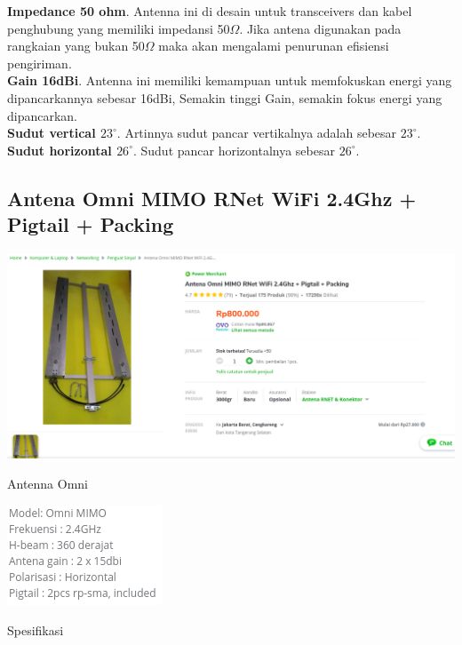 \documentclass[a4paper,12pt]{article}
\begin{document}
\textbf{Impedance 50 ohm}. Antenna ini di desain untuk transceivers dan kabel penghubung yang memiliki impedansi 50$\Omega$. Jika antena digunakan pada rangkaian
yang bukan 50$\Omega$ maka akan mengalami penurunan efisiensi pengiriman.\\

\textbf{Gain 16dBi}. Antenna ini memiliki kemampuan untuk memfokuskan energi yang dipancarkannya sebesar 16dBi, Semakin tinggi Gain, semakin fokus
energi yang dipancarkan.\\

\textbf{Sudut vertical $23^{\circ}$}. Artinnya sudut pancar vertikalnya adalah sebesar $23^{\circ}$.\\

\textbf{Sudut horizontal $26^{\circ}$}. Sudut pancar horizontalnya sebesar $26^{\circ}$.

\subsection{Antena Omni MIMO RNet WiFi 2.4Ghz + Pigtail + Packing}
\begin{minipage}{\linewidth}
    \centering
    \includegraphics[scale=.3]{2a.png}
    \label{fig:antena_omni}
    \caption{Antenna Omni}
\end{minipage}
\begin{minipage}{\linewidth}
    \centering
    \includegraphics[scale=1]{2b.png}\\
    \label{fig:spesifikasi_omni}
    \caption{Spesifikasi}
\end{minipage}
\end{document}
